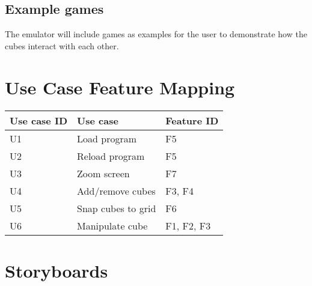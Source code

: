 \documentclass[12pt]{article}
\begin{document}
  \subsection{Example games}
    The emulator will include games as examples for the user to demonstrate how the cubes interact with each other.

\section{Use Case Feature Mapping}
    \begin{table}[h]
      \begin{tabular}{l | l | l}
        \textbf{Use case ID} &
        \textbf{Use case} &
        \textbf{Feature ID} \\ \hline

        U1 &
        Load program &
        F5 \\

        U2 &
        Reload program &
        F5 \\

        U3 &
        Zoom screen &
        F7 \\

        U4 &
        Add/remove cubes &
        F3, F4\\

        U5 &
        Snap cubes to grid &
        F6 \\

        U6 &
        Manipulate cube &
        F1, F2, F3 \\

      \end{tabular}
    \end{table}

\section{Storyboards}

\appendix
\end{document}
